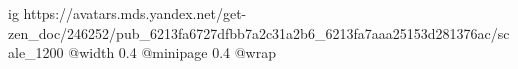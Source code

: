  
 
 
 
 

\ifcmt
  ig https://avatars.mds.yandex.net/get-zen_doc/246252/pub_6213fa6727dfbb7a2c31a2b6_6213fa7aaa25153d281376ac/scale_1200
  @width 0.4
  @minipage 0.4
  @wrap \parpic[r]
\fi
